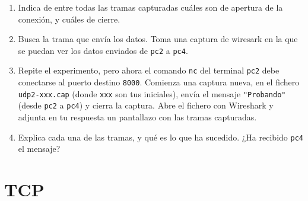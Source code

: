 \documentclass[a4paper]{article}
\begin{document}
\begin{enumerate}[resume]
	\item Indica de entre todas las tramas capturadas cuáles son de apertura de la conexión, y cuáles 
	de cierre.
	
	\item Busca la trama que envía los datos. Toma una captura de wiresark en la que se puedan ver 
	los datos enviados de \texttt{pc2} a \texttt{pc4}.
	
	\item Repite el experimento, pero ahora el comando \texttt{nc} del terminal \texttt{pc2} debe 
	conectarse al puerto destino \texttt{8000}. Comienza una captura nueva, en el fichero 
	\texttt{udp2-xxx.cap} (donde \texttt{xxx} son tus iniciales), envía el mensaje \texttt{"Probando"} 
	(desde \texttt{pc2} a \texttt{pc4}) y cierra la captura. Abre el fichero con Wireshark y adjunta en
	tu respuesta un	pantallazo con las tramas capturadas.
	
	\item Explica cada una de las tramas, y qué es lo que ha sucedido. ¿Ha recibido \texttt{pc4} el mensaje?
	
\end{enumerate}


\section{TCP}
\label{sec:tcp}
\end{document}
